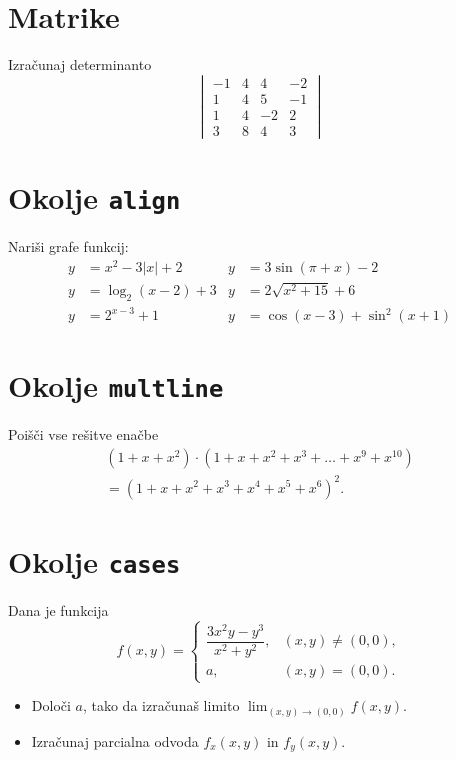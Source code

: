 \documentclass[a4paper,12pt]{article}
\begin{document}
\section*{Matrike}

Izračunaj determinanto
\[
\begin{vmatrix}
-1 & 4 & 4 & -2 \\
1 & 4 & 5 & -1 \\
1 & 4 & -2 & 2 \\
3 & 8 & 4 & 3
\end{vmatrix}
\]

\section*{Okolje \texttt{align}}

Nariši grafe funkcij:
\begin{align*}
y &= x^2 - 3|x| + 2
& y &= 3\sin(\pi+x) - 2 \\
y &= \log_2(x-2) + 3
& y &= 2\sqrt{x^2+15} + 6 \\
y &= 2^{x-3} + 1
& y &= \cos(x-3) + \sin^2(x+1)
\end{align*}

\section*{Okolje \texttt{multline}}

Poišči vse rešitve enačbe
\begin{multline*}
(1+x+x^2)\cdot
(1+x+x^2+x^3+\ldots+x^9+x^{10})\\
=(1+x+x^2+x^3+x^4+x^5+x^6)^2.
\end{multline*}

\section*{Okolje \texttt{cases}}

Dana je funkcija
\[
f(x,y)=
\begin{cases}
\dfrac{3x^2y-y^3}{x^2+y^2},
& (x,y)\neq(0,0),\\
a, & (x,y)=(0,0).
\end{cases}
\]

\begin{itemize}
\item Določi \(a\), tako da izračunaš limito
\(\lim_{(x,y)\to(0,0)} f(x,y)\).
\item Izračunaj parcialna odvoda
\(f_x(x,y)\) in \(f_y(x,y)\).
\end{itemize}
\end{document}
